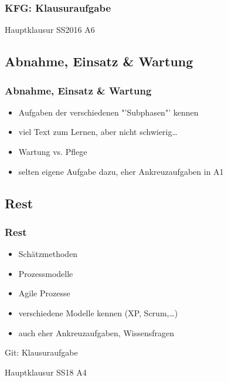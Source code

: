 \documentclass[18pt]{beamer}
\begin{document}
	\begin{frame}
	\frametitle{KFG: Klausuraufgabe}
	\begin{huge}
		\centering Hauptklausur SS2016 A6
	\end{huge}
	\end{frame}
	
	\subsection{Abnahme, Einsatz \& Wartung}
	\begin{frame}
		\frametitle{Abnahme, Einsatz \& Wartung}
		\begin{itemize}
			\item Aufgaben der verschiedenen "'Subphasen"' kennen \pause
			\item viel Text zum Lernen, aber nicht schwierig\dots \pause
			\item Wartung vs. Pflege \pause
			\item selten eigene Aufgabe dazu, eher Ankreuzaufgaben in A1
		\end{itemize}
	\end{frame}

	\subsection{Rest}
	\begin{frame}
		\frametitle{Rest}
		\begin{itemize}
			\item Schätzmethoden \pause
			\item Prozessmodelle \pause
			\item Agile Prozesse \pause
			\item verschiedene Modelle kennen (XP, Scrum,\dots) \pause
			\item auch eher Ankreuzaufgaben, Wissensfragen
		\end{itemize}
	\end{frame}

	\begin{frame}{Git: Klausuraufgabe}
		\begin{huge}
			\centering Hauptklausur SS18 A4
		\end{huge}
	\end{frame}
\end{document}
